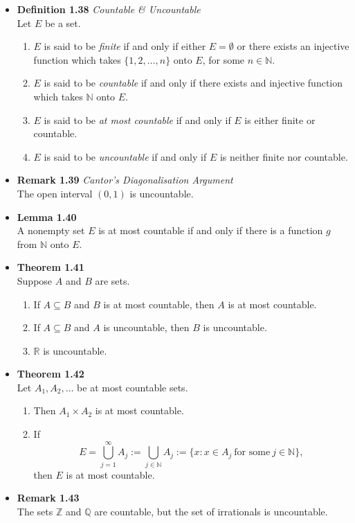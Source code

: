 \documentclass[11pt,a4paper]{article}
\begin{document}
\begin{itemize}
    \item \textbf{Definition 1.38} \emph{Countable \& Uncountable} \\
        Let $E$ be a set.
        \begin{enumerate}
            \item $E$ is said to be \emph{finite} if and only if either $E = \emptyset$
                or there exists an injective function which takes
                $\{ 1, 2, \ldots, n \}$ onto $E$, for some $n \in \mathbb{N}$.
            \item $E$ is said to be \emph{countable} if and only if there exists and injective
                function which takes $\mathbb{N}$ onto $E$.
            \item $E$ is said to be \emph{at most countable} if and only if $E$ is either
                finite or countable.
            \item $E$ is said to be \emph{uncountable} if and only if $E$ is neither finite nor
                countable.
        \end{enumerate}
    \item \textbf{Remark 1.39} \emph{Cantor's Diagonalisation Argument} \\
        The open interval $(0, 1)$ is uncountable.
    \item \textbf{Lemma 1.40} \\
        A nonempty set $E$ is at most countable if and only if there is a function $g$ from
        $\mathbb{N}$ onto $E$.
    \item \textbf{Theorem 1.41} \\
        Suppose $A$ and $B$ are sets.
        \begin{enumerate}
            \item If $A \subseteq B$ and $B$ is at most countable, then $A$ is at most
                countable.
            \item If $A \subseteq B$ and $A$ is uncountable, then $B$ is uncountable.
            \item $\mathbb{R}$ is uncountable.
        \end{enumerate}
    \item \textbf{Theorem 1.42} \\
        Let $A_1, A_2, \ldots$ be at most countable sets.
        \begin{enumerate}
            \item Then $A_1 \times A_2$ is at most countable.
            \item If
                \[
                    E = \bigcup_{j=1}^\infty A_j :=
                    \bigcup_{j \in \mathbb{N}} A_j :=
                    \{ x : x \in A_j \ \text{for some} \ j \in \mathbb{N} \},
                \]
                then $E$ is at most countable.
        \end{enumerate}
    \item \textbf{Remark 1.43} \\
        The sets $\mathbb{Z}$ and $\mathbb{Q}$ are countable, but the set of irrationals is
        uncountable.
\end{itemize}
\end{document}
